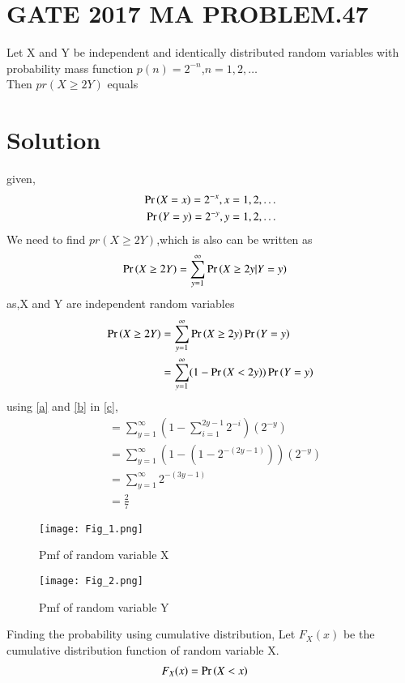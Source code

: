 \documentclass[journal,12pt,twocolumn]{IEEEtran}
\begin{document}
\section{GATE 2017 MA PROBLEM.47 }
Let X and Y be independent and identically distributed random variables with probability mass function $p(n) = 2^{-n}$,$n=1,2,\dots$\\
Then $pr(X\ge 2Y)$ equals 

\section{Solution}
given,\\
\begin{align}
\Pr\left(X=x\right) =2^{-x} ,x=1,2,\dots \label{a}\\
\Pr\left(Y=y\right) =2^{-y} ,y=1,2,\dots \label{b}
\end{align}
We need to find $pr(X\ge 2Y)$,which is also can be written as
\begin{align}
    \Pr\left(X\ge 2Y\right) &=\sum_{y=1}^{\infty}\Pr\left(X \ge 2y|Y=y\right)
\end{align}
as,X and Y are independent random variables
\begin{align}
   \Pr\left(X\ge 2Y\right) &=\sum_{y=1}^{\infty}\Pr\left(X \ge 2y\right)\Pr\left(Y=y\right)\\
               &=\sum_{y=1}^{\infty}(1-\Pr\left(X < 2y\right))\Pr\left(Y=y\right) \label{c}
\end{align}
using \eqref{a} and \eqref{b} in \eqref{c},
\begin{align}
               &=\sum_{y=1}^{\infty}(1- \sum_{i=1}^{2y-1}2^{-i})(2^{-y})\\
               &=\sum_{y=1}^{\infty}(1-(1-2^{-(2y-1)}))(2^{-y})\\
               &=\sum_{y=1}^{\infty}2^{-(3y-1)}\\
               &=\frac{2}{7}
\end{align}
\begin{figure}[ht]
    \centering
    \texttt{[image: Fig\_1.png]}
    \caption{Pmf of random variable X}
    \label{Fig_1}
\end{figure}
\begin{figure}[ht]
    \centering
    \texttt{[image: Fig\_2.png]}
    \caption{Pmf of random variable Y}
    \label{Fig_2}
\end{figure}
Finding the probability using cumulative distribution,
Let $F_X(x)$ be the cumulative distribution function of random variable X.
\begin{align}
    F_X(x)&=\Pr\left(X<x\right)
\end{align}\label{d}
\end{document}
